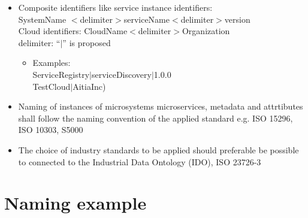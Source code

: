 \documentclass[a4paper]{arrowhead}
\begin{document}
\begin{itemize}
\item Composite identifiers like service instance identifiers: \\
  SystemName $<$delimiter$>$serviceName$<$delimiter$>$version \\
  Cloud identifiers: CloudName$<$delimiter$>$Organization \\
  delimiter: ``$|$”  is proposed
   \begin{itemize}
    \item Examples: \\
      ServiceRegistry$|$serviceDiscovery$|$1.0.0 \\
      TestCloud$|$AitiaInc)
     \end{itemize}
 
  

 
\item Naming of instances of microsystems microservices, metadata and
  attrtibutes shall follow  the naming convention of the
  applied standard e.g. ISO 15296, ISO 10303, S5000
  
\item The choice of industry standards to be applied should preferable
  be possible to connected to the Industrial Data Ontology (IDO), ISO 23726-3


\end{itemize}


\section{Naming example}
\label{sec:examples}
\end{document}
